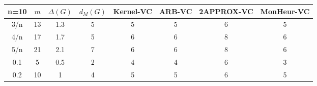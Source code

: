 \begin{tabular}{||c||ccc||cccc||}
 \hline \hline 
 n=10&$m$&$\Delta (G)$&$d_M(G)$& Kernel-VC & ARB-VC & 2APPROX-VC & MonHeur-VC\\ \hline \hline
3/n&13&1.3&5&5&5&6&5\\
4/n&17&1.7&5&6&6&8&6\\
5/n&21&2.1&7&6&6&8&6\\
0.1&5&0.5&2&4&4&6&3\\
0.2&10&1&4&5&5&6&5\\
\hline \end{tabular}

